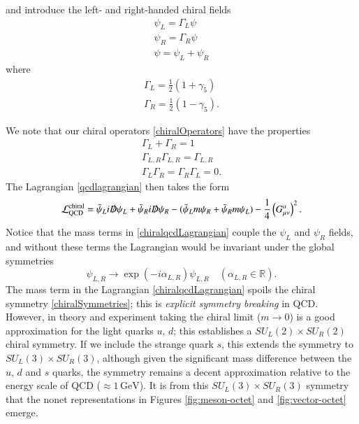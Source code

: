 \documentclass[aps,prd,onecolumn,showpacs,amsmath,amssymb,nofootinbib]{revtex4} \pdfoutput=1
\newcommand{\gev}{\mathrm{GeV}}
\begin{document}
and introduce the left- and right-handed chiral fields
\begin{gather}\label{chiralFields}
    \psi_{L} = \Gamma_{L}\psi\\
    \psi_{R} = \Gamma_{R}\psi\\
    \psi = \psi_{L} + \psi_{R}
\end{gather}
where
\begin{gather}\label{chiralOperators}
    \Gamma_{L} = \frac{1}{2}(1+\gamma_{5})\\
    \Gamma_{R} = \frac{1}{2}(1-\gamma_{5}).
\end{gather}

We note that our chiral operators \eqref{chiralOperators} have the properties 
\begin{gather}
    \Gamma_{L} + \Gamma_{R} = 1\\
    \Gamma_{L,R}\Gamma_{L,R} = \Gamma_{L,R}\\
    \Gamma_{L}\Gamma_{R}= \Gamma_{R}\Gamma_{L} = 0.
\end{gather}
The Lagrangian \eqref{qcdlagrangian} then takes the form
\begin{equation}
    \label{chiralqcdLagrangian}
    \mathcal{L}_\mathrm{QCD}^\mathrm{chiral} = \bar{\psi}_{L}i\slashed{D}\psi_{L}+\bar{\psi}_{R}i\slashed{D}\psi_{R}-(\bar{\psi}_{L} m \psi_{R}+\bar{\psi}_{R} m \psi_{L})-\frac{1}{4}\left(G^{a}_{\mu \nu}\right)^2.
\end{equation}
Notice that the mass terms in \eqref{chiralqcdLagrangian} couple the $\psi_{L}$ and $\psi_{R}$ fields, and without these terms the Lagrangian would be invariant under the global symmetries
\begin{equation}\label{chiralSymmetries}
    \psi_{L,R} \rightarrow \exp(-i \alpha_{L,R}) \psi_{L,R}\quad (\alpha_{L,R} \in \mathbb{R}).
\end{equation}
The mass term in the Lagrangian \eqref{chiralqcdLagrangian} spoils the chiral symmetry \eqref{chiralSymmetries}; this is \textit{explicit symmetry breaking} in QCD. However, in theory and experiment taking the chiral limit ($m \rightarrow 0$) is a good approximation for the light quarks $u,\,d$; this establishes a ${S\!U}_L(2)\times {S\!U}_R(2)$ chiral symmetry. If we include the strange quark $s$, this extends the symmetry to ${S\!U}_L(3)\times {S\!U}_R(3)$, although given the significant mass difference between the $u,\,d$ and $s$ quarks, the symmetry remains a decent approximation relative to the energy scale of QCD ($\approx 1\,\gev$). It is from this ${S\!U}_L(3)\times {S\!U}_R(3)$ symmetry that the nonet representations in Figures \ref{fig:meson-octet} and \ref{fig:vector-octet} emerge. 
\end{document}

